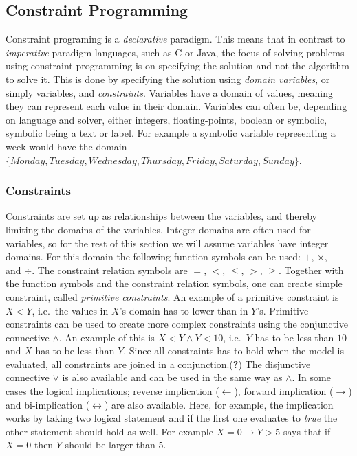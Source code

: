 \subsection{Constraint Programming}
Constraint programing is a \emph{declarative} paradigm. This means that in contrast to \emph{imperative} paradigm languages, such as C or Java, the focus of solving problems using constraint programming is on specifying the solution and not the algorithm to solve it. This is done by specifying the solution using \emph{domain variables}, or simply variables, and \emph{constraints}. Variables have a domain of values, meaning they can represent each value in their domain. Variables can often be, depending on language and solver, either integers, floating-points, boolean or symbolic, symbolic being a text or label. For example a symbolic variable representing a week would have the domain\\
$\{Monday,Tuesday, Wednesday, Thursday, Friday, Saturday, Sunday\}$.

\subsubsection{Constraints}
Constraints are set up as relationships between the variables, and thereby limiting the domains of the variables. Integer domains are often used for variables, so for the rest of this section we will assume variables have integer domains. For this domain the following function symbols can be used: $+$, $\times$, $-$ and $\div$. The constraint relation symbols are $=$, $<$, $\leq$, $>$, $\geq$. Together with the function symbols and the constraint relation symbols, one can create simple constraint, called \emph{primitive constraints}. An example of a primitive constraint is $X < Y$, i.e.\ the values in $X$'s domain has to lower than in $Y$'s. Primitive constraints can be used to create more complex constraints using the conjunctive connective $\land$. An example of this is $X < Y \land Y < 10$, i.e.\ $Y$ has to be less than $10$ and $X$ has to be less than $Y$. Since all constraints has to hold when the model is evaluated, all constraints are joined in a conjunction.(\textbf{?}) The disjunctive connective $\lor$ is also available and can be used in the same way as $\land$. In some cases the logical implications; reverse implication ($\gets$), forward implication ($\to$) and bi-implication ($\leftrightarrow$) are also available. Here, for example, the implication works by taking two logical statement and if the first one evaluates to \emph{true} the other statement should hold as well. For example $X = 0 \to Y > 5$ says that if $X=0$ then $Y$ should be larger than $5$.


